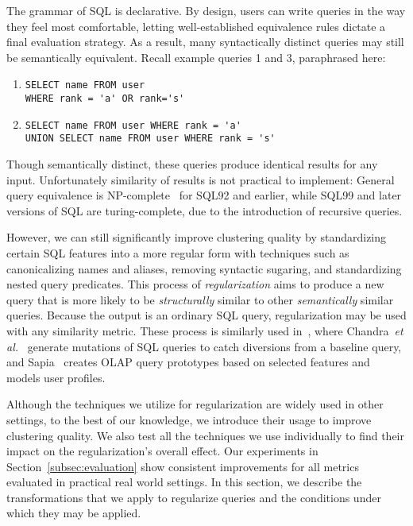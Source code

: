 The grammar of SQL is declarative. By design, users can write queries in the way they feel most comfortable, letting well-established equivalence rules dictate a final evaluation strategy.  As a result, many syntactically distinct queries may still be semantically equivalent.  Recall example queries 1 and 3, paraphrased here:

{\footnotesize
\begin{enumerate}
\item\begin{verbatim}
SELECT name FROM user 
WHERE rank = 'a' OR rank='s'
\end{verbatim}
\item\begin{verbatim}
SELECT name FROM user WHERE rank = 'a'
UNION SELECT name FROM user WHERE rank = 's'
\end{verbatim}
\end{enumerate}
}

Though semantically distinct, these queries produce identical results for any input.  Unfortunately similarity of results is not practical to implement: General query equivalence is NP-complete~\cite{Chandra:1977:OIC:800105.803397} for SQL92 and earlier, while SQL99 and later versions of SQL are turing-complete, due to the introduction of recursive queries.  

However, we can still significantly improve clustering quality by standardizing certain SQL features into a more regular form with techniques such as canonicalizing names and aliases, removing syntactic sugaring, and standardizing nested query predicates.
This process of \emph{regularization} aims to produce a new query that is more likely to be \emph{structurally} similar to other \emph{semantically} similar queries. 
Because the output is an ordinary SQL query, regularization may be used with any similarity metric.
These process is similarly used in~\cite{Chandra:2016:PMA:3007263.3007304, sapia1999modeling}, where Chandra~\textit{et al.}~\cite{Chandra:2016:PMA:3007263.3007304} generate mutations of SQL queries to catch diversions from a baseline query, and Sapia~\cite{sapia1999modeling} creates OLAP query prototypes based on selected features and models user profiles.


Although the techniques we utilize for regularization are widely used in other settings, to the best of our knowledge, we introduce their usage to improve clustering quality.
We also test all the techniques we use individually to find their impact on the regularization's overall effect.
Our experiments in Section~\ref{subsec:evaluation} show consistent improvements for all metrics evaluated in practical real world settings.
In this section, we describe the transformations that we apply to regularize queries and the conditions under which they may be applied.  

